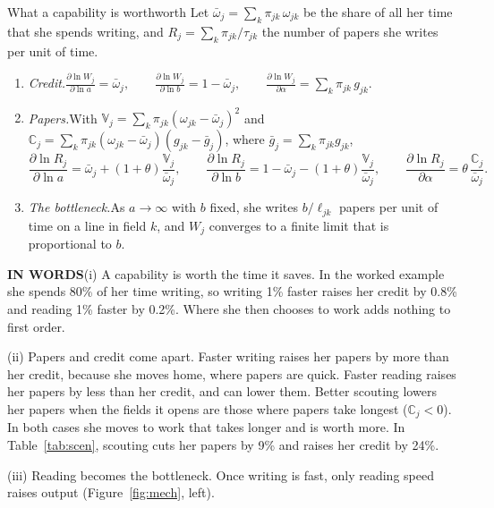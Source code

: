 \documentclass[11pt,letterpaper]{article}
\newcommand{\inwords}{{\sffamily\bfseries\footnotesize\color{hbluedark}IN WORDS}\enspace}
\newcommand{\Var}{\mathbb{V}}
\newcommand{\Cov}{\mathbb{C}}
\begin{document}
\begin{prop}{What a capability is worth}{worth}
Let $\bar\omega_j=\sum_k\pi_{jk}\,\omega_{jk}$ be the share of all her time that she spends writing, and $R_j=\sum_k\pi_{jk}/\tau_{jk}$ the number of papers she writes per unit of time.
\begin{enumerate}[label=(\roman*),leftmargin=2em]
\item \emph{Credit.}\enspace $\displaystyle\frac{\partial\ln W_j}{\partial\ln a}=\bar\omega_j,\qquad \frac{\partial\ln W_j}{\partial\ln b}=1-\bar\omega_j,\qquad \frac{\partial\ln W_j}{\partial\alpha}=\sum_k\pi_{jk}\,g_{jk}.$
\item \emph{Papers.}\enspace With $\Var_j=\sum_k\pi_{jk}(\omega_{jk}-\bar\omega_j)^2$ and $\Cov_j=\sum_k\pi_{jk}(\omega_{jk}-\bar\omega_j)(g_{jk}-\bar g_j)$, where $\bar g_j=\sum_k\pi_{jk}g_{jk}$,
\[
\frac{\partial\ln R_j}{\partial\ln a}=\bar\omega_j+(1+\theta)\frac{\Var_j}{\bar\omega_j},\qquad
\frac{\partial\ln R_j}{\partial\ln b}=1-\bar\omega_j-(1+\theta)\frac{\Var_j}{\bar\omega_j},\qquad
\frac{\partial\ln R_j}{\partial\alpha}=\theta\,\frac{\Cov_j}{\bar\omega_j}.
\]
\item \emph{The bottleneck.}\enspace As $a\to\infty$ with $b$ fixed, she writes $b/\ell_{jk}$ papers per unit of time on a line in field $k$, and $W_j$ converges to a finite limit that is proportional to $b$.
\end{enumerate}
\tcblower
\inwords (i) A capability is worth the time it saves. In the worked example she spends 80\% of her time writing, so writing 1\% faster raises her credit by 0.8\% and reading 1\% faster by 0.2\%. Where she then chooses to work adds nothing to first order.

(ii) Papers and credit come apart. Faster writing raises her papers by more than her credit, because she moves home, where papers are quick. Faster reading raises her papers by less than her credit, and can lower them. Better scouting lowers her papers when the fields it opens are those where papers take longest ($\Cov_j<0$). In both cases she moves to work that takes longer and is worth more. In Table~\ref{tab:scen}, scouting cuts her papers by 9\% and raises her credit by 24\%.

(iii) Reading becomes the bottleneck. Once writing is fast, only reading speed raises output (Figure~\ref{fig:mech}, left).
\end{prop}
\end{document}
